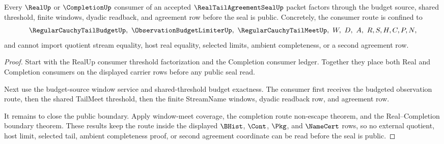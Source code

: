 \begin{theorem}
\label{thm:real-tail-agreement-seal-real-completion-budgeted-route}
Every $\RealUp$ or $\CompletionUp$ consumer of an accepted $\RealTailAgreementSealUp$ packet factors through the budget source, shared threshold, finite windows, dyadic readback, and agreement row before the seal is public. Concretely, the consumer route is confined to
$$
\RegularCauchyTailBudgetUp,\ \ObservationBudgetLimiterUp,\ \RegularCauchyTailMeetUp,\ W,\ D,\ A,\ R,S,H,C,P,N,
$$
and cannot import quotient stream equality, host real equality, selected limits, ambient completeness, or a second agreement row.
\end{theorem}
\begin{proof}
Start with the RealUp consumer threshold factorization and the Completion consumer ledger. Together they place both Real and Completion consumers on the displayed carrier rows before any public seal read.

Next use the budget-source window service and shared-threshold budget exactness. The consumer first receives the budgeted observation route, then the shared TailMeet threshold, then the finite StreamName windows, dyadic readback row, and agreement row.

It remains to close the public boundary. Apply window-meet coverage, the completion route non-escape theorem, and the Real--Completion boundary theorem. These results keep the route inside the displayed $\BHist$, $\Cont$, $\Pkg$, and $\NameCert$ rows, so no external quotient, host limit, selected tail, ambient completeness proof, or second agreement coordinate can be read before the seal is public.
\end{proof}

